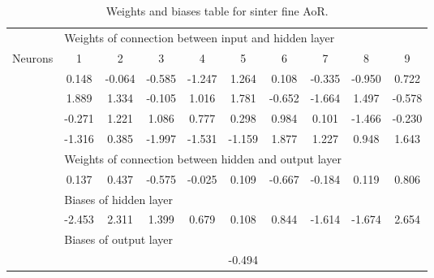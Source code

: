 \begin{table}[htbp] 
 \centering 
\begin{tabular}{l|ccccccccc} 
 \hline 
   &    \multicolumn{9}{l}{Weights of connection between input and hidden layer}  \\ 
 Neurons & 1 &  2 &  3 &  4 &  5 &  6 &  7 &  8 & 9 \\ 
 \hline 
  & 0.148 &  -0.064 &  -0.585 &  -1.247 &  1.264 &  0.108 &  -0.335 &  -0.950 &  0.722 \\ 
  & 1.889 &  1.334 &  -0.105 &  1.016 &  1.781 &  -0.652 &  -1.664 &  1.497 &  -0.578 \\ 
  & -0.271 &  1.221 &  1.086 &  0.777 &  0.298 &  0.984 &  0.101 &  -1.466 &  -0.230 \\ 
  & -1.316 &  0.385 &  -1.997 &  -1.531 &  -1.159 &  1.877 &  1.227 &  0.948 &  1.643 \\ 
\hline 
   &    \multicolumn{9}{l}{Weights of connection between hidden and output layer}  \\ 
  & 0.137 &  0.437 &  -0.575 &  -0.025 &  0.109 &  -0.667 &  -0.184 &  0.119 &  0.806 \\ 
\hline 
   &    \multicolumn{9}{l}{Biases of hidden layer}  \\ 
  & -2.453 &  2.311 &  1.399 &  0.679 &  0.108 &  0.844 &  -1.614 &  -1.674 &  2.654 \\ 
\hline 
   &    \multicolumn{9}{l}{Biases of output layer}  \\ 
 &    \multicolumn{9}{c}{-0.494}  \\ 
\hline 
 \end{tabular} 
\caption[Weights and biases table for sinter fine AoR]{Weights and biases table
for sinter fine \acs{AoR}.}
\label{tab:35weightssinterfineaor} 
\end{table}